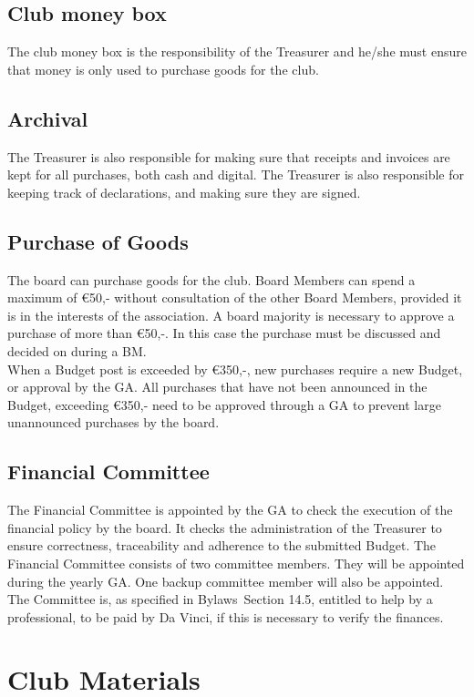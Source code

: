 \documentclass[a4paper]{article}
\newcommand{\Asta}{Bylaws} %
\begin{document}
\subsection{Club money box}
The club money box is the responsibility of the Treasurer and he/she must ensure that money is only used to purchase goods for the club.

\subsection{Archival}
The Treasurer is also responsible for making sure that receipts and invoices are kept for all purchases, both cash and digital. The Treasurer is also responsible for keeping track of declarations, and making sure they are signed.

\subsection{Purchase of Goods}
The board can purchase goods for the club. Board Members can spend a maximum of €50,- without consultation of the other Board Members, provided it is in the interests of the association. A board majority is necessary to approve a purchase of more than €50,-. In this case the purchase must be discussed and decided on during a BM. \\

When a Budget post is exceeded by €350,-, new purchases require a new Budget, or approval by the GA. All purchases that have not been announced in the Budget, exceeding €350,- need to be approved through a GA to prevent large unannounced purchases by the board.

\subsection{Financial Committee}
The Financial Committee is appointed by the GA to check the execution of the financial policy by the board. It checks the administration of the Treasurer to ensure correctness, traceability and adherence to the submitted Budget. The Financial Committee consists of two committee members. They will be appointed during the yearly GA. One backup committee member will also be appointed. The Committee is, as specified in \Asta\ Section 14.5, entitled to help by a professional, to be paid by Da Vinci, if this is necessary to verify the finances.

\section{Club Materials}
\end{document}
